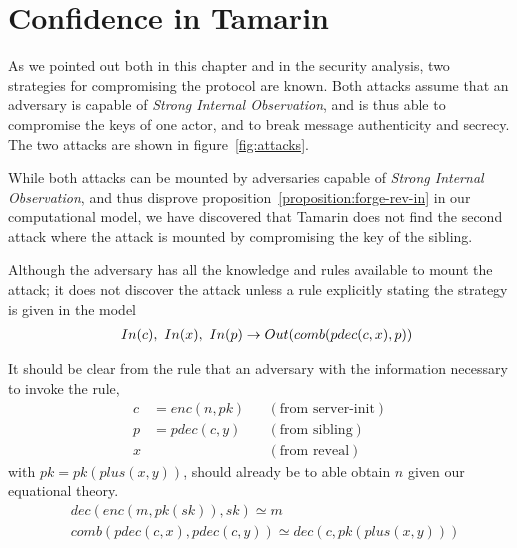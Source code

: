 
\section{Confidence in Tamarin}

As we pointed out both in this chapter and in the security analysis, two strategies for compromising the protocol are known. Both attacks assume that an adversary is capable of \textit{Strong Internal Observation}, and is thus able to compromise the keys of one actor, and to break message authenticity and secrecy. The two attacks are shown in figure~\ref{fig:attacks}. 

While both attacks can be mounted by adversaries capable of \textit{Strong Internal Observation}, and thus disprove proposition~\ref{proposition:forge-rev-in} in our computational model, we have discovered that Tamarin does not find the second attack where the attack is mounted by compromising the key of the \gls{sibling}. 

Although the adversary has all the knowledge and rules available to mount the attack; it does not discover the attack unless a rule explicitly stating the strategy is given in the model
\begin{align*} 
&& In(c),~In(x),~In(p) \ifarrow Out(comb(pdec(c,x), p)) 
\end{align*}

It should be clear from the rule that an adversary with the information necessary to invoke the rule,
\begin{align*}
    c &= enc(n, pk) && (\text{from  server-init}) \\
    p &= pdec(c,y) && (\text{from sibling})\\
    x & && (\text{from reveal})
\end{align*}
with $pk = pk(plus(x,y))$, should already be to able obtain $n$ given our equational theory.
\begin{align*}
&    dec(enc(m,pk(sk)), sk) \simeq m\\
&    comb(pdec(c,x), pdec(c,y)) \simeq dec(c,pk(plus(x,y)))
\end{align*}

